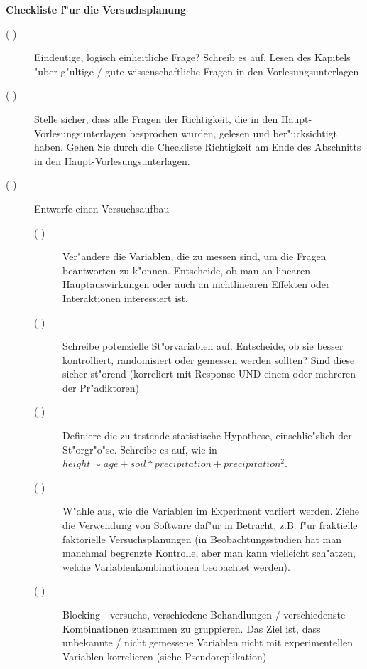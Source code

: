 \documentclass[a4paper,twoside]{tufte-book}\usepackage[]{graphicx}\usepackage[]{color}
\begin{document}
\newpage
\begin{mdframed}
    
\textbf{Checkliste f"ur die Versuchsplanung}

\begin{description}

\item[( )] Eindeutige, logisch einheitliche Frage? Schreib es auf. Lesen des Kapitels "uber g"ultige / gute wissenschaftliche Fragen in den Vorlesungsunterlagen

\item[( )] Stelle sicher, dass alle Fragen der Richtigkeit, die in den Haupt-Vorlesungsunterlagen besprochen wurden, gelesen und ber"ucksichtigt haben. Gehen Sie durch die Checkliste Richtigkeit am Ende des Abschnitts in den Haupt-Vorlesungsunterlagen.

\item[( )] Entwerfe einen Versuchsaufbau

  \begin{description}

  \item[( )] Ver"andere die Variablen, die zu messen sind, um die Fragen beantworten zu k"onnen. Entscheide, ob man an linearen Hauptauswirkungen oder auch an nichtlinearen Effekten oder Interaktionen interessiert ist.
  
  \item[( )] Schreibe potenzielle St"orvariablen auf. Entscheide, ob sie besser kontrolliert, randomisiert oder gemessen werden sollten? Sind diese sicher st"orend (korreliert mit Response UND einem oder mehreren der Pr"adiktoren)
  
  \item[( )] Definiere die zu testende statistische Hypothese, einschlie"slich der St"orgr"o"se. Schreibe es auf, wie in $height  \sim age + soil * precipitation + precipitation^2$. 
  
  \item[( )] W"ahle aus, wie die Variablen im Experiment variiert werden. Ziehe die Verwendung von Software daf"ur in Betracht, z.B. f"ur fraktielle faktorielle Versuchsplanungen (in Beobachtungsstudien hat man manchmal begrenzte Kontrolle, aber man kann vielleicht sch"atzen, welche Variablenkombinationen beobachtet werden).
  
  \item[( )] Blocking - versuche, verschiedene Behandlungen / verschiedenste Kombinationen zusammen zu gruppieren. Das Ziel ist, dass unbekannte / nicht gemessene Variablen nicht mit experimentellen Variablen korrelieren (siehe Pseudoreplikation)
  

\end{description}
\end{description}
\end{mdframed}
\end{document}
